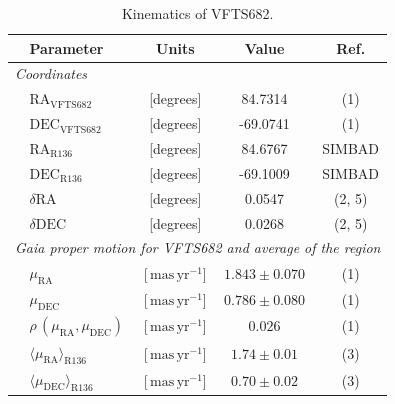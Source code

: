 \documentclass[apjl,twocolumn]{emulateapj}
\newcommand{\masyr}{\,\mathrm{mas}\,\mathrm{yr}^{-1}}
\begin{document}
\begin{table}
  \begin{center}
    \caption{Kinematics of VFTS682. }
    \begin{tabular}{llc|c|c}
      \hline
      \hline
      &Parameter & Units & Value & Ref.\\
      \hline
      \multicolumn{5}{l}{\emph{Coordinates}} \\
      \hline
         &$\mathrm{RA}_\mathrm{VFTS682}$&[degrees] & \phantom{-}84.7314 %
                     & (1) \\        
               &$\mathrm{DEC}_\mathrm{VFTS682}$&[degrees] & -69.0741%
                     & (1)  \\    
                                                     
                        &$\mathrm{RA}_\mathrm{R136}$&[degrees] & \phantom{-}84.6767
                     &  SIMBAD  \\        
               &$     \mathrm{DEC}_\mathrm{R136}$&[degrees] &  -69.1009
                     &  SIMBAD \\       
        &$      \delta\mathrm{RA}$  &[degrees] & \phantom{-0}0.0547                      
        &  (2, 5)
  \\        
               &$     \delta\mathrm{DEC}$  &[degrees] & \phantom{-0}0.0268 
                     &  (2, 5) \\       


     
       \hline
           \multicolumn{5}{l}{\emph{Gaia proper motion for VFTS682
      and average of the region}} \\
      \hline
          &$\mu_\mathrm{RA}$&[$\masyr$] & $1.843\pm 0.070$
                     & (1) \\        
               &$\mu_\mathrm{DEC}$&[$\masyr$] & $0.786\pm 0.080$
                     &  (1) \\        
                 & $\rho\,(\mu_\mathrm{RA}, \mu_\mathrm{DEC})$ &[$\masyr$] & $0.026$
                        & (1)  \\         
       &$\langle\mu_\mathrm{RA}\rangle_\mathrm{R136}$&[$\masyr$] & $1.74\pm0.01$
                        & (3) \\
      &$\langle\mu_\mathrm{DEC}\rangle_\mathrm{R136}$&[$\masyr$]
                & $0.70\pm0.02$ &  (3)\\
\hline
      

\end{tabular}
\end{center}
\end{table}
\end{document}
